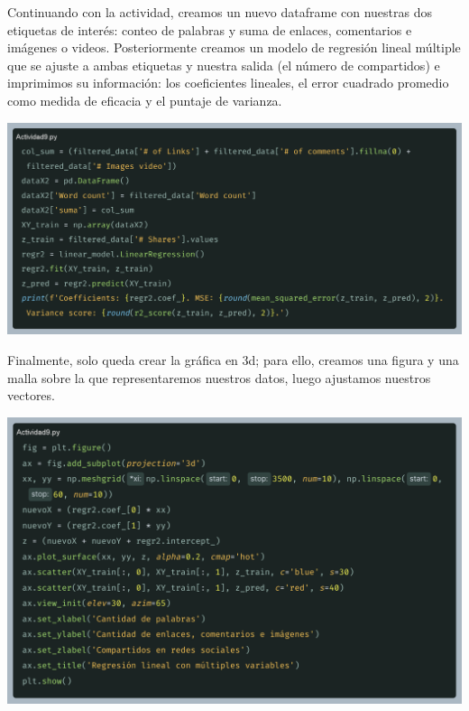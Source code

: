 \documentclass[12pt, letterpaper]{article}
\begin{document}
    Continuando con la actividad, creamos un nuevo dataframe con nuestras dos etiquetas de interés: conteo de palabras y suma de enlaces, comentarios e imágenes o videos. Posteriormente creamos un modelo de regresión lineal múltiple que se ajuste a ambas etiquetas y nuestra salida (el número de compartidos) e imprimimos su información: los coeficientes lineales, el error cuadrado promedio como medida de eficacia y el puntaje de varianza.
    \begin{center}
        \includegraphics[width=160mm]{2025-03-23-23-30-04.png}
    \end{center}
    Finalmente, solo queda crear la gráfica en 3d; para ello, creamos una figura y una malla sobre la que representaremos nuestros datos, luego ajustamos nuestros vectores.
    \begin{center}
        \includegraphics[width=140mm]{2025-03-23-23-34-21.png}
    \end{center}
\end{document}
